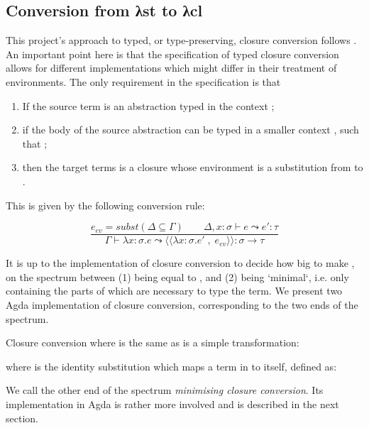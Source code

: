 \documentclass[bsc,frontabs,oneside,singlespacing,parskip,deptreport]{infthesis}
\theoremstyle{definition}
\theoremstyle{lemma}
\begin{document}
\subsection{Conversion from λst to λcl}
\label{sec:conversion-from-st}

This project's approach to typed, or type-preserving, closure
conversion follows \cite{DBLP:conf/popl/MinamideMH96}. An important
point here is that the specification of typed closure conversion
allows for different implementations which might differ in their
treatment of environments. The only requirement in the specification
is that

\begin{enumerate}
\item If the source term is an abstraction typed in the context
  ;
\item if the body of the source abstraction can be typed in a smaller
  context , such that ;
\item then the target terms is a closure whose environment is a
  substitution from  to .
\end{enumerate}

This is given by the following conversion rule:

\[
  \frac
  {e_{ev} = subst (\Delta \subseteq \Gamma) \quad \quad \Delta , x : \sigma \vdash e \leadsto e' : \tau }
  {\Gamma \vdash \lambda x : \sigma . e \leadsto
    \langle\langle \lambda x : \sigma . e' \; , \; e_{ev} \rangle\rangle : \sigma \rightarrow \tau}
\]

It is up to the implementation of closure conversion to decide how big
to make , on the spectrum between (1)  being equal to
, and (2)  being `minimal`, i.e. only containing the parts
of  which are necessary to type the term. We present two Agda
implementation of closure conversion, corresponding to the two ends of
the spectrum.

Closure conversion where  is the same as  is a simple
transformation:


where  is the identity substitution which maps a term
in  to itself, defined as:


We call the other end of the spectrum \textit{minimising closure
  conversion}. Its implementation in Agda is rather more involved and
is described in the next section.
\end{document}
